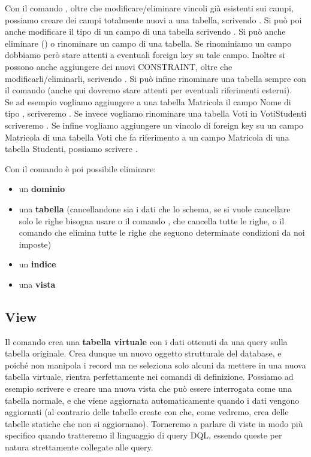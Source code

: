 \documentclass[11pt, a4paper, titlepage, oneside]{scrbook}
\begin{document}
Con il comando , oltre che modificare/eliminare vincoli già esistenti sui campi, possiamo creare dei campi totalmente nuovi a una tabella, scrivendo . Si può poi anche modificare il tipo di un campo di una tabella scrivendo . Si può anche eliminare () o rinominare  un campo di una tabella. Se rinominiamo un campo dobbiamo però stare attenti a eventuali foreign key su tale campo. Inoltre si possono anche aggiungere dei nuovi CONSTRAINT, oltre che modificarli/eliminarli, scrivendo . Si può infine rinominare una tabella sempre con il comando  (anche qui dovremo stare attenti per eventuali riferimenti esterni).  \\
Se ad esempio vogliamo aggiungere a una tabella Matricola il campo Nome di tipo , scriveremo \mbox{}. Se invece vogliamo rinominare una tabella Voti in VotiStudenti scriveremo . Se infine vogliamo aggiungere un vincolo di foreign key su un campo Matricola di una tabella Voti che fa riferimento a un campo Matricola di una tabella Studenti, possiamo scrivere .

Con il comando  è poi possibile eliminare:
\begin{itemize}
    \item un \textbf{dominio}
    \item una \textbf{tabella} (cancellandone sia i dati che lo schema, se si vuole cancellare solo le righe bisogna usare o il comando , che cancella tutte le righe, o il comando  che elimina tutte le righe che seguono determinate condizioni da noi imposte)
    \item un \textbf{indice}
    \item una \textbf{vista} 
\end{itemize}

\subsection*{View}

Il comando  crea una \textbf{tabella virtuale} con i dati ottenuti da una query sulla tabella originale. Crea dunque un nuovo oggetto strutturale del database, e poiché non manipola i record ma ne seleziona solo alcuni da mettere in una nuova tabella virtuale, rientra perfettamente nei comandi di definizione. Possiamo ad esempio scrivere  e creare una nuova vista che può essere interrogata come una tabella normale, e che viene aggiornata automaticamente quando i dati vengono aggiornati (al contrario delle tabelle create con  che, come vedremo, crea delle tabelle statiche che non si aggiornano). Torneremo a parlare di viste in modo più specifico quando tratteremo il linguaggio di query DQL, essendo queste per natura strettamente collegate alle query.
\end{document}
